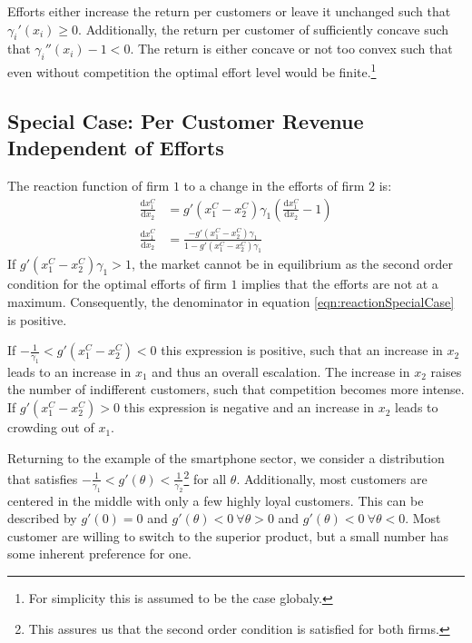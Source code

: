 \documentclass[a4paper, 11pt]{article}
\renewcommand{\d}{\text{d}}
\begin{document}
Efforts either increase the return per customers or leave it unchanged such that $\gamma_i'(x_i)\geq 0$. Additionally, the return per customer of sufficiently concave such that $\gamma_i''(x_i) - 1<0$. The return is either concave or not too convex such that even without competition the optimal effort level would be finite.\footnote{For simplicity this is assumed to be the case globaly.}

\subsection{Special Case: Per Customer Revenue Independent of Efforts}
The reaction function of firm $1$ to a change in the efforts of firm $2$ is:
\begin{align}
\frac{\d x_1^C}{\d x_2} &= g'(x_1^C-x_2^C)\gamma_1\left(\frac{\d x_1^C}{\d x_2}-1\right)\nonumber\\
\frac{\d x_1^C}{\d x_2} &= \frac{-g'(x_1^C-x_2^C)\gamma_1}{1-g'(x_1^C-x_2^C)\gamma_1}
\label{eqn:reactionSpecialCase}
\end{align}
If $g'(x_1^C-x_2^C)\gamma_1 > 1$, the market cannot be in equilibrium as the second order condition for the optimal efforts of firm $1$ implies that the efforts are not at a maximum. Consequently, the denominator in equation \ref{eqn:reactionSpecialCase} is positive. 

If $-\frac{1}{\gamma_1}<g'(x_1^C-x_2^C)<0$ this expression is positive, such that an increase in $x_2$ leads to an increase in $x_1$ and thus an overall escalation. The increase in $x_2$ raises the number of indifferent customers, such that competition becomes more intense. If $g'(x_1^C-x_2^C)>0$ this expression is negative and an increase in $x_2$ leads to crowding out of $x_1$. 

Returning to the example of the smartphone sector, we consider a distribution that satisfies $-\frac{1}{\gamma_1}<g'(\theta)<\frac{1}{\gamma_2}$\footnote{This assures us that the second order condition is satisfied for both firms.} for all $\theta$. Additionally, most customers are centered in the middle with only a few highly loyal customers. This can be described by $g'(0)=0$ and $g'(\theta)<0~\forall \theta>0$ and $g'(\theta)<0~\forall \theta<0$. Most customer are willing to switch to the superior product, but a small number has some inherent preference for one.
\end{document}
